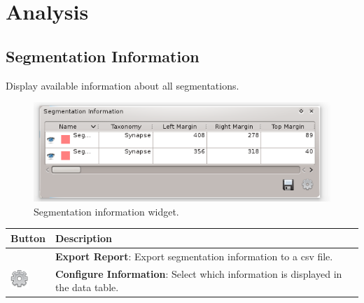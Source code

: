 \section{Analysis}

\subsection{Segmentation Information}

Display available information about all segmentations.

\begin{figure}[htb]
\centering
\includegraphics{fig/SegmentationInformation}
\caption{Segmentation information widget.}
\end{figure}
\vspace{0.3cm}

\begin{tabular}{| m{1.3cm} | m{13.5cm} |}
\hline
\textbf{Button} & \textbf{Description}\\
\hline
 &
\textbf{Export Report}: Export segmentation information to a csv file.\\
\hline
\includegraphics[width=0.7cm]{../../frontend/rsc/settings} &
\textbf{Configure Information}: Select which information is displayed in the data table.\\
\hline
\end{tabular}
